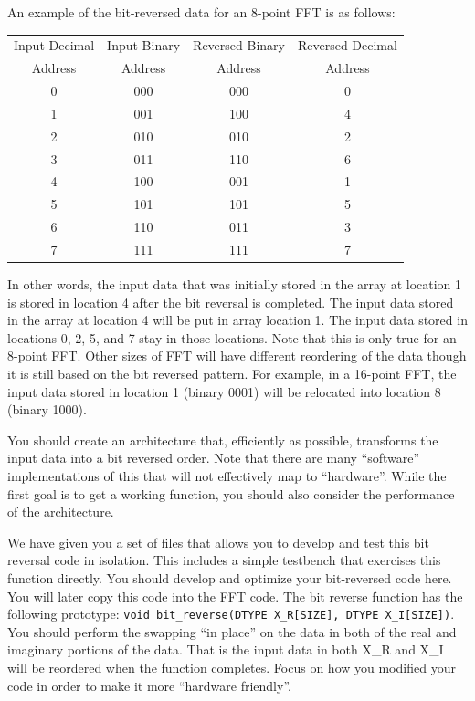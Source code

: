 \documentclass[a4paper,12pt,twoside]{article}
\begin{document}
An example of the bit-reversed data for an 8-point FFT is as follows:
\begin{table}[H]
    \centering
    \begin{tabular}{|c|c|c|c|}
        \hline
        Input Decimal&Input Binary&Reversed Binary&Reversed Decimal\\
        Address&Address&Address&Address\\
        \hline
        0&000&000&0\\
        \hline
        1&001&100&4\\
        \hline
        2&010&010&2\\
        \hline
        3&011&110&6\\
        \hline
        4&100&001&1\\
        \hline
        5&101&101&5\\
        \hline
        6&110&011&3\\
        \hline
        7&111&111&7\\
        \hline
    \end{tabular}
\end{table}
In other words, the input data that was initially stored in the array at location 1 is stored in location 4 after the bit reversal is completed. The input data stored in the array at location 4 will be put in array location 1. The input data stored in locations 0, 2, 5, and 7 stay in those locations. Note that this is only true for an 8-point FFT. Other sizes of FFT will have different reordering of the data though it is still based on the bit reversed pattern. For example, in a 16-point FFT, the input data stored in location 1 (binary 0001) will be relocated into location 8 (binary 1000).

You should create an architecture that, efficiently as possible, transforms the input data into a bit reversed order. Note that there are many “software” implementations of this that will not effectively map to “hardware”. While the first goal is to get a working function, you should also consider the performance of the architecture.

We have given you a set of files that allows you to develop and test this bit reversal code in isolation. This includes a simple testbench that exercises this function directly. You should develop and optimize your bit-reversed code here. You will later copy this code into the FFT code. The bit reverse function has the following prototype: \verb|void bit_reverse(DTYPE X_R[SIZE], DTYPE X_I[SIZE])|. You should perform the swapping “in place” on the data in both of the real and imaginary portions of the data. That is the input data in both X\_R and X\_I will be reordered when the function completes. Focus on how you modified your code in order to make it more “hardware friendly”.
\end{document}
